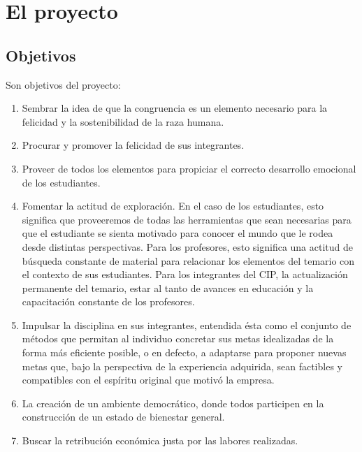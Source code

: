 \documentclass[10pt,letterpaper,oneside]{book}
\begin{document}
\section{El proyecto}

\subsection{Objetivos}
Son objetivos del proyecto:
\begin{enumerate}
\item Sembrar la idea de que la congruencia es un elemento necesario para la felicidad y la sostenibilidad de la raza humana.
\item Procurar y promover la felicidad de sus integrantes.
\item Proveer de todos los elementos para propiciar el correcto desarrollo emocional de los estudiantes.
\item Fomentar la actitud de exploración. En el caso de los estudiantes, esto significa que proveeremos de todas las herramientas que sean necesarias para que el estudiante se sienta motivado para conocer el mundo que le rodea desde distintas perspectivas. Para los profesores, esto significa una actitud de búsqueda constante de material para relacionar los elementos del temario con el contexto de sus estudiantes. Para los integrantes del CIP, la actualización permanente del temario, estar al tanto de avances en educación y la capacitación constante de los profesores.
\item Impulsar la disciplina en sus integrantes, entendida ésta como el conjunto de métodos que permitan al individuo concretar sus metas idealizadas de la forma más eficiente posible, o en defecto, a adaptarse para proponer nuevas metas que, bajo la perspectiva de la experiencia adquirida, sean factibles y compatibles con el espíritu original que motivó la empresa.
\item La creación de un ambiente democrático, donde todos participen en la construcción de un estado de bienestar general.
\item Buscar la retribución económica justa por las labores realizadas.
\end{enumerate}
\end{document}
